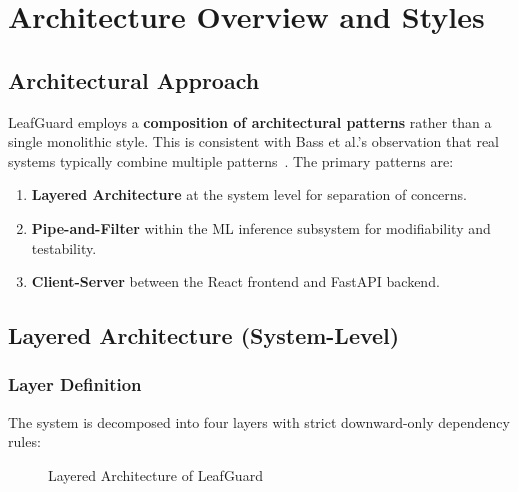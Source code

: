 \documentclass[11pt,a4paper,oneside]{report}
\begin{document}
\chapter{Architecture Overview and Styles}

\section{Architectural Approach}

LeafGuard employs a \textbf{composition of architectural patterns} rather than a single monolithic style. This is consistent with Bass et al.'s observation that real systems typically combine multiple patterns~\cite{bass2024}. The primary patterns are:

\begin{enumerate}
  \item \textbf{Layered Architecture} at the system level for separation of concerns.
  \item \textbf{Pipe-and-Filter} within the ML inference subsystem for modifiability and testability.
  \item \textbf{Client-Server} between the React frontend and FastAPI backend.
\end{enumerate}

\section{Layered Architecture (System-Level)}

\subsection{Layer Definition}

The system is decomposed into four layers with strict downward-only dependency rules:

\begin{figure}[H]
\centering
{}
\caption{Layered Architecture of LeafGuard}
\label{fig:layers}
\end{figure}
\end{document}
